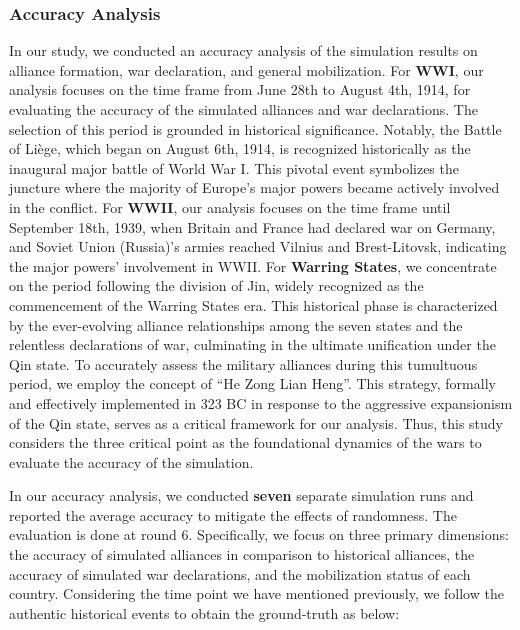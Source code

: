 \documentclass{article}
\begin{document}
\subsubsection{Accuracy Analysis}
In our study, we conducted an accuracy analysis of the simulation results on alliance formation, war declaration, and general mobilization. For \textbf{WWI}, our analysis focuses on the time frame from June 28th to August 4th, 1914, for evaluating the accuracy of the simulated alliances and war declarations.
The selection of this period is grounded in historical significance. Notably, the Battle of Liège, which began on August 6th, 1914, is recognized historically as the inaugural major battle of World War I. This pivotal event symbolizes the juncture where the majority of Europe's major powers became actively involved in the conflict. For \textbf{WWII}, our analysis focuses on the time frame until September 18th, 1939, when Britain and France had declared war on Germany, and Soviet Union (Russia)'s armies reached Vilnius and Brest-Litovsk, indicating the major powers' involvement in WWII. For \textbf{Warring States}, we concentrate on the period following the division of Jin, widely recognized as the commencement of the Warring States era. This historical phase is characterized by the ever-evolving alliance relationships among the seven states and the relentless declarations of war, culminating in the ultimate unification under the Qin state. To accurately assess the military alliances during this tumultuous period, we employ the concept of ``He Zong Lian Heng''. This strategy, formally and effectively implemented in 323 BC in response to the aggressive expansionism of the Qin state, serves as a critical framework for our analysis. Thus, this study considers the three critical point as the foundational dynamics of the wars to evaluate the accuracy of the simulation.

In our accuracy analysis, we conducted \textbf{seven} separate simulation runs and reported the average accuracy to mitigate the effects of randomness. The evaluation is done at round 6. Specifically, we focus on three primary dimensions: the accuracy of simulated alliances in comparison to historical alliances, the accuracy of simulated war declarations, and the mobilization status of each country. 
Considering the time point we have mentioned previously, we follow the authentic historical events to obtain the ground-truth as below: 
\end{document}
